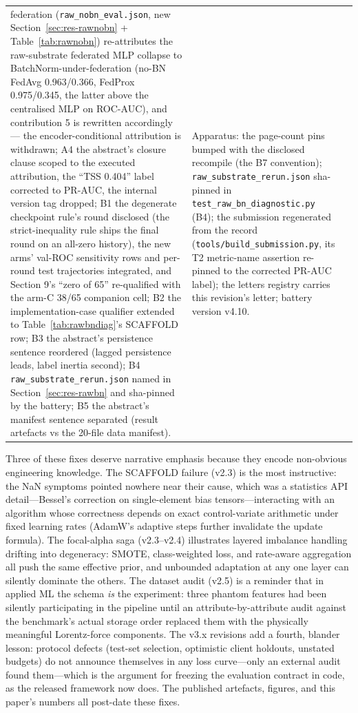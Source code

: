\begin{longtable}{@{}p{} >{\raggedright\arraybackslash}p{} >{\raggedright\arraybackslash}p{}@{}}
federation (\texttt{raw\_nobn\_eval.json}, new
Section~\ref{sec:res-rawnobn} + Table~\ref{tab:rawnobn}) re-attributes
the raw-substrate federated MLP collapse to
BatchNorm-under-federation (no-BN FedAvg 0.963/0.366, FedProx
0.975/0.345, the latter above the centralised MLP on ROC-AUC), and
contribution 5 is rewritten accordingly — the encoder-conditional
attribution is withdrawn; A4 the abstract's closure clause scoped to
the executed attribution, the ``TSS 0.404'' label corrected to
PR-AUC, the internal version tag dropped; B1 the degenerate
checkpoint rule's round disclosed (the strict-inequality rule ships
the final round on an all-zero history), the new arms'
val-ROC sensitivity rows and per-round test trajectories
integrated, and Section 9's ``zero of 65'' re-qualified with the
arm-C 38/65 companion cell; B2 the implementation-case qualifier
extended to Table~\ref{tab:rawbndiag}'s SCAFFOLD row; B3 the
abstract's persistence sentence reordered (lagged persistence leads,
label inertia second); B4 \texttt{raw\_substrate\_rerun.json} named
in Section~\ref{sec:res-rawbn} and sha-pinned by the battery; B5 the
abstract's manifest sentence separated (result artefacts vs the
20-file data manifest). & Apparatus: the page-count pins bumped with
the disclosed recompile (the B7 convention);
\texttt{raw\_substrate\_rerun.json} sha-pinned in
\texttt{test\_raw\_bn\_diagnostic.py} (B4); the submission
regenerated from the record (\texttt{tools/build\_submission.py},
its T2 metric-name assertion re-pinned to the corrected PR-AUC
label); the letters registry carries this revision's letter; battery
version v4.10. \\
\end{longtable}
\endgroup

Three of these fixes deserve narrative emphasis because they encode
non-obvious engineering knowledge. The SCAFFOLD failure (v2.3) is the
most instructive: the NaN symptoms pointed nowhere near their cause,
which was a statistics API detail---Bessel's correction on
single-element bias tensors---interacting with an algorithm whose
correctness depends on exact control-variate arithmetic under fixed
learning rates (AdamW's adaptive steps further invalidate the update
formula). The focal-alpha saga (v2.3--v2.4) illustrates layered
imbalance handling drifting into degeneracy: SMOTE, class-weighted
loss, and rate-aware aggregation all push the same effective prior,
and unbounded adaptation at any one layer can silently dominate the
others. The dataset audit (v2.5) is a reminder that in applied ML the
schema \emph{is} the experiment: three phantom features had been
silently participating in the pipeline until an attribute-by-attribute
audit against the benchmark's actual storage order replaced them with
the physically meaningful Lorentz-force components. The v3.x
revisions add a fourth, blander lesson: protocol defects
(test-set selection, optimistic client holdouts, unstated budgets)
do not announce themselves in any loss curve---only an external audit
found them---which is the argument for freezing the evaluation
contract in code, as the released framework now does. The published
artefacts, figures, and this paper's numbers all post-date these
fixes.

